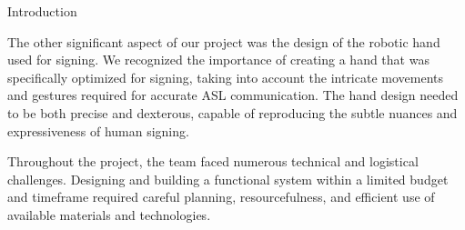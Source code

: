 \documentclass[final, 20pt]{beamer}
\newlength{\colwidth}
\newlength{\twocolwidth}
\begin{document}
\begin{frame}[t]
\begin{columns}[t]
\begin{column}{\twocolwidth}
\begin{block}{Introduction}
\begin{multicols}{2}
      The other significant aspect of our project was the design of the robotic hand used for signing. We recognized the importance of creating a hand that was specifically optimized for signing, taking into account the intricate movements and gestures required for accurate ASL communication. The hand design needed to be both precise and dexterous, capable of reproducing the subtle nuances and expressiveness of human signing.

      Throughout the project, the team faced numerous technical and logistical challenges. Designing and building a functional system within a limited budget and timeframe required careful planning, resourcefulness, and efficient use of available materials and technologies.


    \end{multicols}
  \end{block}


\end{column}
\end{columns}
\end{frame}
\end{document}
